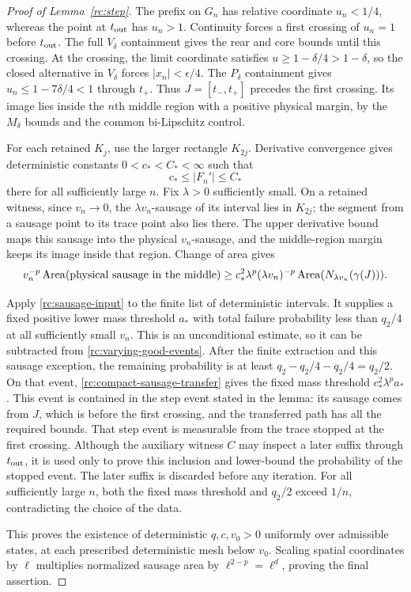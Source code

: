 \begin{proof}[Proof of Lemma~\ref{rc:step}]
The prefix on $G_n$ has relative coordinate $u_n<1/4$, whereas the
point at $t_{\rm out}$ has $u_n>1$. Continuity forces a first crossing
of $u_n=1$ before $t_{\rm out}$. The full $V_\delta$ containment gives
the rear and core bounds until this crossing. At the crossing, the
limit coordinate satisfies $u\ge1-\delta/4>1-\delta$, so the closed
alternative in $V_\delta$ forces $|x_n|<\epsilon/4$. The
$P_\delta$ containment gives $u_n\le1-7\delta/4<1$ through $t_+$.
Thus $J=[t_-,t_+]$ precedes the first crossing. Its image lies inside
the $n$th middle region with a positive physical margin, by the
$M_\delta$ bounds and the common bi-Lipschitz control.

For each retained $K_j$, use the larger rectangle $K_{2j}$.
Derivative convergence gives deterministic constants
$0<c_*<C_*<\infty$ such that
\[
 c_*\le |F_n'|\le C_*
\]
there for all sufficiently large $n$. Fix $\lambda>0$ sufficiently
small. On a retained witness, since $v_n\to0$, the
$\lambda v_n$-sausage of its interval lies in $K_{2j}$; the segment
from a sausage point to its trace point also lies there. The upper
derivative bound maps this
sausage into the physical $v_n$-sausage, and the middle-region margin
keeps its image inside that region. Change of area gives
\begin{equation}\label{rc:compact-sausage-transfer}
 v_n^{-p}\operatorname{Area}(\hbox{physical sausage in the middle})
 \ge c_*^2\lambda^p
   (\lambda v_n)^{-p}\operatorname{Area}
      (N_{\lambda v_n}(\gamma(J))).
\end{equation}

Apply \eqref{rc:sausage-input} to the finite list of deterministic
intervals. It supplies a fixed positive lower mass threshold $a_*$ with
total failure probability less than $q_2/4$ at all sufficiently small
$v_n$. This is an unconditional estimate, so it can be subtracted
from \eqref{rc:varying-good-events}. After the finite extraction and
this sausage exception, the remaining probability is at least
$q_2-q_2/4-q_2/4=q_2/2$. On that event,
\eqref{rc:compact-sausage-transfer} gives the fixed mass threshold
$c_*^2\lambda^p a_*$. This event is contained in the step event stated
in the lemma: its sausage comes from $J$, which is before the first
crossing, and the transferred path has all the required bounds.
That step event is measurable from the trace stopped at the first
crossing. Although the auxiliary witness $C$ may inspect a later suffix
through $t_{\rm out}$, it is used only to prove this inclusion and
lower-bound the probability of the stopped event. The later suffix is
discarded before any iteration. For all sufficiently large $n$, both
the fixed mass threshold and $q_2/2$ exceed $1/n$, contradicting the
choice of the data.

This proves the existence of deterministic $q,c,v_0>0$ uniformly over
admissible states, at each prescribed deterministic mesh below $v_0$.
Scaling spatial coordinates by $\ell$ multiplies normalized sausage area by
$\ell^{2-p}=\ell^d$, proving the final assertion.
\end{proof}

